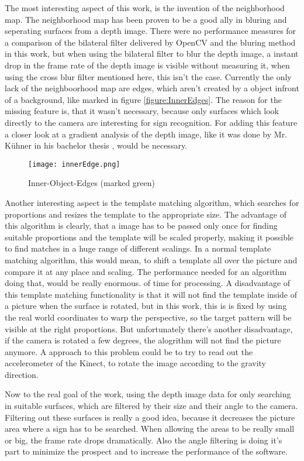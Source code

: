 The most interesting aspect of this work, is the invention of the neighborhood map. The neighborhood map has been proven
to be a good ally in bluring and seperating surfaces from a depth image. There were no performance
measures for a comparison of the bilateral filter delivered by OpenCV and the bluring method in this work,
but when using the bilateral filter to blur the depth image, a instant drop in the frame rate of the depth image is visible
without measuring it, when using the cross blur filter mentioned here, this isn't the case. Currently the only lack
of the neighboorhood map are edges, which aren't created by a object infront of a background, like marked in figure \vref{figure:InnerEdges}.
The reason for the missing feature is, that it wasn't necessary, because only surfaces which look directly to the camera 
are interesting for sign recognition. For adding this feature a closer look at a gradient analysis of the depth image,
like it was done by Mr. Kühner in his bachelor thesis \cite{max:recog}, would be necessary.

\begin{figure}[H]
\begin{center}
  \texttt{[image: innerEdge.png]}
  \caption{Inner-Object-Edges (marked green)}
  \label{figure:InnerEdges}
\end{center}
\end{figure}

Another interesting aspect is the template matching algorithm, which searches for proportions and resizes the
template to the appropriate size. The advantage of this algorithm is clearly, that a image has to be passed
only once for finding suitable proportions and the template will be scaled properly, making it possible
to find matches in a huge range of different scalings. In a normal template matching algorithm,
this would mean, to shift a template all over the picture and compare it at any place and scaling.
The performance needed for an algorithm doing that, would be really enormous.
of time for processing. A disadvantage of this template matching functionality is that it will not
find the template inside of a picture when the surface is rotated, but in this work, this is
is fixed by using the real world coordinates to warp the perspective, so the target pattern
will be visible at the right proportions. But unfortunately there's another disadvantage,
if the camera is rotated a few degrees, the alogrithm will not find the picture anymore.
A approach to this problem could be to try to read out the accelerometer of the Kinect,
to rotate the image according to the gravity direction.

Now to the real goal of the work, using the depth image data for only searching in suitable surfaces,
which are filtered by their size and their angle to the camera. Filtering out these surfaces
is really a good idea, because it decreases the picture area where a sign has to be searched.
When allowing the areas to be really small or big, the frame rate drops dramatically. Also
the angle filtering is doing it's part to minimize the prospect and to increase the performance
of the software. 